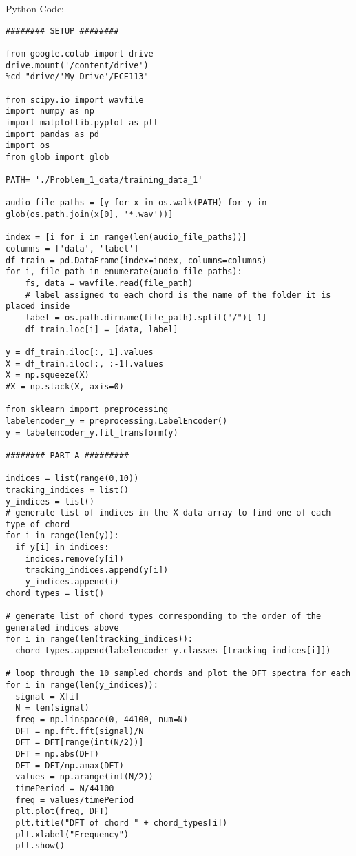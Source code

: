 \documentclass[letterpaper,twocolumn,10pt]{article}
\begin{document}
Python Code:
\begin{verbatim}
######## SETUP ########

from google.colab import drive
drive.mount('/content/drive') 
%cd "drive/'My Drive'/ECE113" 

from scipy.io import wavfile
import numpy as np
import matplotlib.pyplot as plt
import pandas as pd
import os
from glob import glob

PATH= './Problem_1_data/training_data_1'

audio_file_paths = [y for x in os.walk(PATH) for y in glob(os.path.join(x[0], '*.wav'))]

index = [i for i in range(len(audio_file_paths))]
columns = ['data', 'label']
df_train = pd.DataFrame(index=index, columns=columns)
for i, file_path in enumerate(audio_file_paths):
    fs, data = wavfile.read(file_path)
    # label assigned to each chord is the name of the folder it is placed inside
    label = os.path.dirname(file_path).split("/")[-1]
    df_train.loc[i] = [data, label]
    
y = df_train.iloc[:, 1].values
X = df_train.iloc[:, :-1].values
X = np.squeeze(X)
#X = np.stack(X, axis=0)

from sklearn import preprocessing
labelencoder_y = preprocessing.LabelEncoder()
y = labelencoder_y.fit_transform(y)

######## PART A #########

indices = list(range(0,10))
tracking_indices = list()
y_indices = list()
# generate list of indices in the X data array to find one of each type of chord
for i in range(len(y)):
  if y[i] in indices:
    indices.remove(y[i])
    tracking_indices.append(y[i])
    y_indices.append(i)
chord_types = list()

# generate list of chord types corresponding to the order of the generated indices above
for i in range(len(tracking_indices)):
  chord_types.append(labelencoder_y.classes_[tracking_indices[i]])
  
# loop through the 10 sampled chords and plot the DFT spectra for each
for i in range(len(y_indices)):
  signal = X[i]
  N = len(signal)
  freq = np.linspace(0, 44100, num=N)
  DFT = np.fft.fft(signal)/N
  DFT = DFT[range(int(N/2))]
  DFT = np.abs(DFT)
  DFT = DFT/np.amax(DFT)
  values = np.arange(int(N/2))
  timePeriod = N/44100
  freq = values/timePeriod
  plt.plot(freq, DFT)
  plt.title("DFT of chord " + chord_types[i])
  plt.xlabel("Frequency")
  plt.show()
  
  
  

\end{verbatim}
\end{document}
